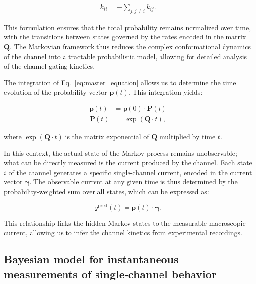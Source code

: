 \documentclass[pdflatex,sn-mathphys-num]{sn-jnl}%
\theoremstyle{thmstyleone}%
\theoremstyle{thmstyletwo}%
\theoremstyle{thmstylethree}%
\begin{document}
\begin{align}
	k_{ii} = -\sum_{j, j \neq i} k_{ij}.
	\label{eq:Q_diagonal_element}
\end{align}

This formulation ensures that the total probability remains normalized over time, with the transitions between states governed by the rates encoded in the matrix \( \boldsymbol{Q} \). The Markovian framework thus reduces the complex conformational dynamics of the channel into a tractable probabilistic model, allowing for detailed analysis of the channel gating kinetics.


The integration of Eq.~\ref{eq:master_equation} allows us to determine the time evolution of the probability vector \( \boldsymbol{p}(t) \). This integration yields:


\begin{align}
	\boldsymbol{p}(t) &= \boldsymbol{p}(0) \cdot \boldsymbol{P}(t)
	\label{eq:master_equation_solution}
\end{align}
\begin{align}
	\boldsymbol{P} (t) &= \exp(\boldsymbol{Q} \cdot t),
	\label{eq:Transition_Matrix_definition}
\end{align}


where \( \exp(\boldsymbol{Q} \cdot t) \) is the matrix exponential of \( \boldsymbol{Q} \) multiplied by time \( t \). 

In this context, the actual state of the Markov process remains unobservable; what can be directly measured is the current produced by the channel. Each state \( i \) of the channel generates a specific single-channel current, encoded in the current vector \( \boldsymbol{\gamma} \). The observable current at any given time is thus determined by the probability-weighted sum over all states, which can be expressed as:

\begin{equation}
	y^{\text{pred}}(t) = \boldsymbol{p}(t) \cdot \boldsymbol{\gamma}.
	\label{eq:single_channel_prediction}
\end{equation}

This relationship links the hidden Markov states to the measurable macroscopic current, allowing us to infer the channel kinetics from experimental recordings.



\subsection{Bayesian model for instantaneous measurements of single-channel behavior}
\end{document}
